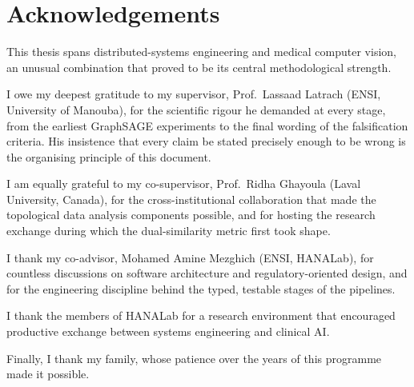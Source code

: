 \chapter*{Acknowledgements}

This thesis spans distributed-systems engineering and medical computer vision, an
unusual combination that proved to be its central methodological strength.

I owe my deepest gratitude to my supervisor, Prof.\ Lassaad Latrach (ENSI, University of
Manouba), for the scientific rigour he demanded at every stage, from the earliest
GraphSAGE experiments to the final wording of the falsification criteria. His insistence
that every claim be stated precisely enough to be wrong is the organising principle of
this document.

I am equally grateful to my co-supervisor, Prof.\ Ridha Ghayoula (Laval University,
Canada), for the cross-institutional collaboration that made the topological data
analysis components possible, and for hosting the research exchange during which the
dual-similarity metric first took shape.

I thank my co-advisor, Mohamed Amine Mezghich (ENSI, HANALab), for countless discussions
on software architecture and regulatory-oriented design, and for the engineering
discipline behind the typed, testable stages of the pipelines.

I thank the members of HANALab for a research environment that encouraged productive
exchange between systems engineering and clinical AI.

Finally, I thank my family, whose patience over the years of this programme made it
possible.
